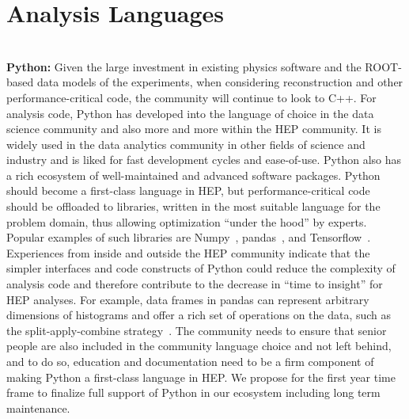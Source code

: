 \documentclass[12pt,a4paper]{article}
\begin{document}
\section{Analysis Languages}~\\
{\bf Python:} Given the large investment in existing physics software and the ROOT-based data models of the experiments, when considering reconstruction and other performance-critical code, the community will continue to look to C++. For analysis code, Python has developed into the language of choice in the data science community and also more and more within the HEP community. It is widely used in the data analytics community in other fields of science and industry and is liked for fast development cycles and ease-of-use. Python also has a rich ecosystem of well-maintained and advanced software packages. Python should become a first-class language in HEP, but performance-critical code should be offloaded to libraries, written in the most suitable language for the problem domain, thus allowing optimization ``under the hood'' by experts. Popular examples of such libraries are Numpy~\cite{5725236-numpy}, pandas~\cite{mckinney-proc-scipy-2010}, and Tensorflow~\cite{abadi2016tensorflow}.  Experiences from inside and outside the HEP community indicate that the simpler interfaces and code constructs of Python could reduce the complexity of analysis code and therefore contribute to the decrease in ``time to insight'' for HEP analyses. For example, data frames in pandas can represent arbitrary dimensions of histograms and offer a rich set of operations on the data, such as the split-apply-combine strategy~\cite{JSSv040i01}. The community needs to ensure that senior people are also included in the community language choice and not left behind, and to do so, education and documentation need to be a firm component of making Python a first-class language in HEP. We propose for the first year time frame to finalize full support of Python in our ecosystem including long term maintenance.\\ \\
\end{document}
